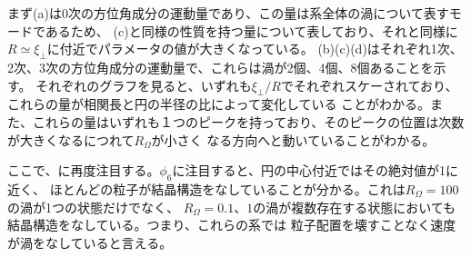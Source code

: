 \documentclass[/Users/ikedahajime/GitHub/reserch/master_report/thesis]{subfiles}
\begin{document}
まず(a)は0次の方位角成分の運動量であり、この量は系全体の渦について表すモードであるため、
(c)と同様の性質を持つ量について表しており、それと同様に$R\simeq\xi_\bot$に付近でパラメータの値が大きくなっている。
(b)(c)(d)はそれぞれ1次、2次、3次の方位角成分の運動量で、これらは渦が2個、4個、8個あることを示す。
それぞれのグラフを見ると、いずれも$\xi_\bot/R$でそれぞれスケーされており、これらの量が相関長と円の半径の比によって変化している
ことがわかる。また、これらの量はいずれも１つのピークを持っており、そのピークの位置は次数が大きくなるにつれて$R_\Omega$が小さく
なる方向へと動いていることがわかる。


ここで、に再度注目する。$\phi_6$に注目すると、円の中心付近ではその絶対値が1に近く、
ほとんどの粒子が結晶構造をなしていることが分かる。これは$R_{\Omega}=100$の渦が1つの状態だけでなく、
$R_{\Omega}=0.1、1$の渦が複数存在する状態においても結晶構造をなしている。つまり、これらの系では
粒子配置を壊すことなく速度が渦をなしていると言える。
\end{document}
